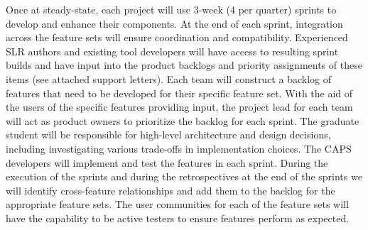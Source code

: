 Once at steady-state, each project will use 3-week (4 per quarter) sprints to develop and enhance their components. 
At the end of each sprint, integration across the feature sets will ensure coordination and compatibility.  
Experienced SLR authors and existing tool developers will have access to resulting sprint builds and have input into the product backlogs and priority assignments of these items (see attached support letters).  
Each team will construct a backlog of features that need to be developed for their specific feature set.
With the aid of the users of the specific features providing input, the project lead for each team will act as product owners to prioritize the backlog for each sprint.  
The graduate student will be responsible for high-level architecture and design decisions, including investigating various trade-offs in implementation choices.
The CAPS developers will implement and test the features in each sprint.
During the execution of the sprints and during the retrospectives at the end of the sprints we will identify cross-feature relationships and add them to the backlog for the appropriate feature sets.
The user communities for each of the feature sets will have the capability to be active testers to ensure features perform as expected.  

